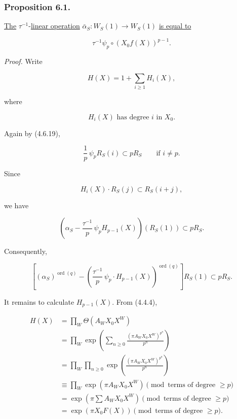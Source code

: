 \subsubsection*{Proposition 6.1.}
\underline{The} $\tau^{-1}$-\underline{linear operation}
$\bar\alpha_S:W_S(1)\to W_S(1)$ \underline{is equal to}

\begin{equation}\tag{6.1.1}
\tau^{-1}\psi_p\circ(X_0f(X))^{p-1}.
\end{equation}

\noindent\emph{Proof.}
Write

\begin{equation}\tag{6.1.2}
H(X)=1+\sum_{i\geq1}H_i(X),
\end{equation}

where

\begin{equation}\tag{6.1.3}
H_i(X)\text{ has degree $i$ in }X_0.
\end{equation}

Again by (4.6.19),

\begin{equation}\tag{6.1.4}
\frac1p\,\psi_pR_S(i)\subset pR_S
\qquad\text{if }i\ne p.
\end{equation}

Since

\begin{equation}\tag{6.1.5}
H_i(X)\cdot R_S(j)\subset R_S(i+j),
\end{equation}

we have

\begin{equation}\tag{6.1.6}
\left(
\alpha_S-\frac{\tau^{-1}}p\,\psi_pH_{p-1}(X)
\right)(R_S(1))
\subset pR_S.
\end{equation}

Consequently,

\begin{equation}\tag{6.1.7}
\left[
(\alpha_S)^{\operatorname{ord}(q)}
-
\left(
\frac{\tau^{-1}}p\,\psi_p\cdot H_{p-1}(X)
\right)^{\operatorname{ord}(q)}
\right]R_S(1)
\subset pR_S.
\end{equation}

It remains to calculate $H_{p-1}(X)$.  From (4.4.4),

\begin{equation}\tag{6.1.8}
\begin{aligned}
H(X)
&=\prod_W\Theta(A_WX_0X^W)\\
&=\prod_W\exp\!\left(
\sum_{n\geq0}\frac{(\pi A_WX_0X^W)^{p^n}}{p^n}
\right)\\
&=\prod_W\prod_{n\geq0}
\exp\!\left(\frac{(\pi A_WX_0X^W)^{p^n}}{p^n}\right)\\
&\equiv\prod_W\exp(\pi A_WX_0X^W)
\pmod{\text{terms of degree }\geq p}\\
&=\exp\!\left(\pi\sum A_WX_0X^W\right)
\pmod{\text{terms of degree }\geq p}\\
&=\exp(\pi X_0F(X))
\pmod{\text{terms of degree }\geq p}.
\end{aligned}
\end{equation}

